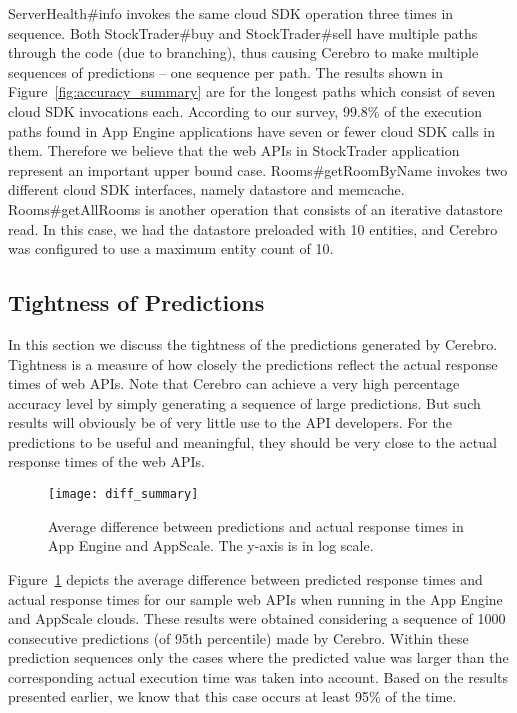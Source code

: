 ServerHealth\#info invokes the same cloud SDK operation three times in sequence. Both StockTrader\#buy and StockTrader\#sell have
multiple paths through the code (due to branching), thus causing Cerebro to make multiple sequences of predictions -- one sequence
per path. The results shown in Figure~\ref{fig:accuracy_summary} are for the longest paths which consist of seven cloud SDK invocations each. According to
our survey, 99.8\% of the execution paths found in App Engine applications have seven or fewer cloud SDK calls in them. Therefore we believe
that the web APIs in StockTrader application represent an important upper bound case. Rooms\#getRoomByName
invokes two different cloud SDK interfaces, namely datastore and memcache. Rooms\#getAllRooms is another operation that consists of
an iterative datastore read. In this case, we had the datastore preloaded with 10 entities, and Cerebro was configured to use a maximum entity
count of 10. %

\subsection{Tightness of Predictions}
In this section we discuss the tightness of the predictions generated by Cerebro. Tightness is a measure of how closely the predictions
reflect the actual response times of web APIs. 
Note that Cerebro can achieve a very high percentage accuracy level by simply generating a 
sequence of large predictions. But such results will obviously be of very little use to the API
developers. For the predictions to be useful and meaningful, they should be very close to the actual response times of the web APIs.

\begin{figure}
\centering
\texttt{[image: diff\_summary]}
\caption{Average difference between predictions and actual response times in App Engine and AppScale. The y-axis is in log scale.}
\label{fig:diff_summary}
\end{figure}

Figure~\ref{fig:diff_summary} depicts the average difference between predicted response times and actual response times for
our sample web APIs when running in the App Engine and AppScale clouds. 
These results were obtained considering a sequence of 1000 consecutive predictions (of 95th percentile) made by Cerebro. 
Within these prediction sequences only the cases 
where the predicted value was larger than the corresponding actual execution time was taken into account. Based on the results
presented earlier, we know that this case occurs at least 95\% of the time.

